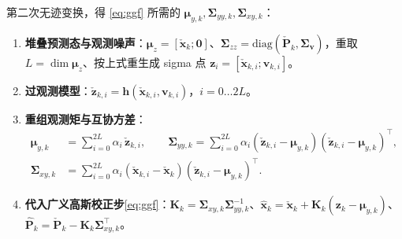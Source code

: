 \begin{algo}\label{algo:spkf-correct}
第二次无迹变换，得 \cref{eq:ggf} 所需的 $\boldsymbol{\mu}_{y,k},\boldsymbol{\Sigma}_{yy,k},\boldsymbol{\Sigma}_{xy,k}$\cite{barfoot2024state}：
\begin{enumerate}
  \item \textbf{堆叠预测态与观测噪声}：$\boldsymbol{\mu}_z=[\check{\mathbf{x}}_k;\mathbf{0}]$、$\boldsymbol{\Sigma}_{zz}=\mathrm{diag}(\check{\mathbf{P}}_k,\boldsymbol{\Sigma}_{\mathbf{v}})$，重取 $L=\dim\boldsymbol{\mu}_z$、按上式重生成 sigma 点 $\mathbf{z}_i=[\check{\mathbf{x}}_{k,i};\mathbf{v}_{k,i}]$。
  \item \textbf{过观测模型}：$\check{\mathbf{z}}_{k,i}=\mathbf{h}(\check{\mathbf{x}}_{k,i},\mathbf{v}_{k,i})$，$i=0\dots2L$。
  \item \textbf{重组观测矩与互协方差}：
  \begin{align}
    \boldsymbol{\mu}_{y,k}&=\sum_{i=0}^{2L}\alpha_i\,\check{\mathbf{z}}_{k,i},\qquad
    \boldsymbol{\Sigma}_{yy,k}=\sum_{i=0}^{2L}\alpha_i(\check{\mathbf{z}}_{k,i}-\boldsymbol{\mu}_{y,k})(\check{\mathbf{z}}_{k,i}-\boldsymbol{\mu}_{y,k})^\top,\label{eq:spkf-corr-moments}\\
    \boldsymbol{\Sigma}_{xy,k}&=\sum_{i=0}^{2L}\alpha_i(\check{\mathbf{x}}_{k,i}-\check{\mathbf{x}}_k)(\check{\mathbf{z}}_{k,i}-\boldsymbol{\mu}_{y,k})^\top.\label{eq:spkf-corr-cross}
  \end{align}
  \item \textbf{代入广义高斯校正步}\cref{eq:ggf}：$\mathbf{K}_k=\boldsymbol{\Sigma}_{xy,k}\boldsymbol{\Sigma}_{yy,k}^{-1}$、$\hat{\mathbf{x}}_k=\check{\mathbf{x}}_k+\mathbf{K}_k(\mathbf{z}_k-\boldsymbol{\mu}_{y,k})$、$\hat{\mathbf{P}}_k=\check{\mathbf{P}}_k-\mathbf{K}_k\boldsymbol{\Sigma}_{xy,k}^\top$。
\end{enumerate}
\end{algo}

